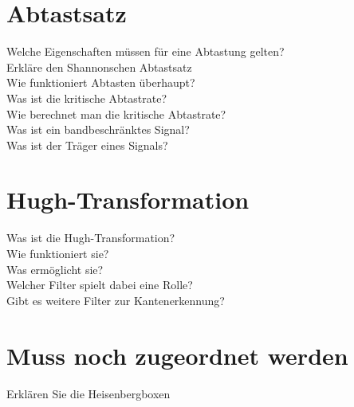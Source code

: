 \section{Abtastsatz}
\begin{description}
	\item[Welche Eigenschaften müssen für eine Abtastung gelten?]
	\item[Erkläre den Shannonschen Abtastsatz]
	\item[Wie funktioniert Abtasten überhaupt?]
	\item[Was ist die kritische Abtastrate?]
	\item[Wie berechnet man die kritische Abtastrate?]
	\item[Was ist ein bandbeschränktes Signal?]
	\item[Was ist der Träger eines Signals?]
	\end{description}
\section{Hugh-Transformation}
\begin{description}
	\item[Was ist die Hugh-Transformation?]
	\item[Wie funktioniert sie?]
	\item[Was ermöglicht sie?]
	\item[Welcher Filter spielt dabei eine Rolle?]
	\item[Gibt es weitere Filter zur Kantenerkennung?]
\end{description}
\section{Muss noch zugeordnet werden}
\begin{description}
	\item[Erklären Sie die Heisenbergboxen]
\end{description}

